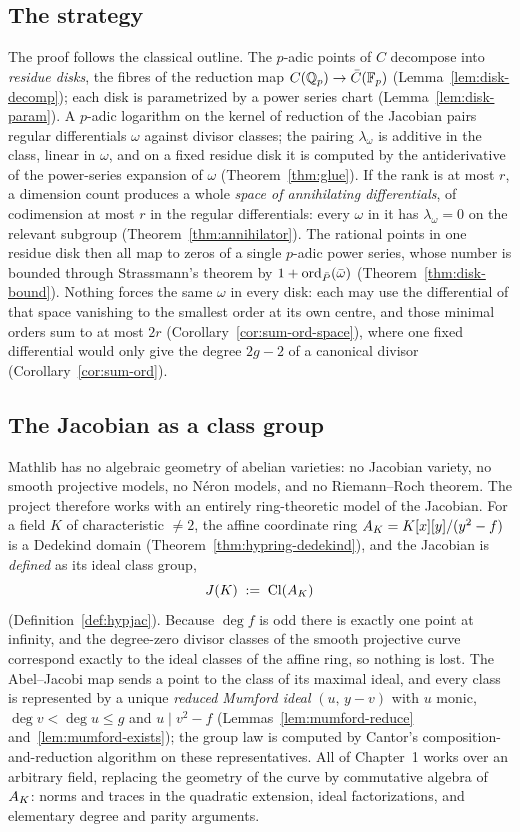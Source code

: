 \subsection*{The strategy}

The proof follows the classical outline. The $p$-adic points of $C$ decompose into
\emph{residue disks}, the fibres of the reduction map $C(\mathbb{Q}_p) \to \bar C(\mathbb{F}_p)$
(Lemma~\ref{lem:disk-decomp}); each disk is parametrized by a power series chart
(Lemma~\ref{lem:disk-param}). A $p$-adic logarithm on the kernel of reduction of the
Jacobian pairs regular differentials $\omega$ against divisor classes; the pairing
$\lambda_\omega$ is additive in the class, linear in $\omega$, and on a fixed residue disk
it is computed by the antiderivative of the power-series expansion of $\omega$
(Theorem~\ref{thm:glue}). If the rank is at most $r$, a dimension count produces a whole
\emph{space of annihilating differentials}, of codimension at most $r$ in the regular
differentials: every $\omega$ in it has $\lambda_\omega = 0$ on the relevant subgroup
(Theorem~\ref{thm:annihilator}). The rational points in one residue disk then all map to
zeros of a single $p$-adic power series, whose number is bounded through Strassmann's
theorem by $1 + \operatorname{ord}_{\bar P}(\bar\omega)$ (Theorem~\ref{thm:disk-bound}). Nothing forces
the same $\omega$ in every disk: each may use the differential of that space vanishing to
the smallest order at its own centre, and those minimal orders sum to at most $2r$
(Corollary~\ref{cor:sum-ord-space}), where one fixed differential would only give the
degree $2g-2$ of a canonical divisor (Corollary~\ref{cor:sum-ord}).

\subsection*{The Jacobian as a class group}

Mathlib has no algebraic geometry of abelian varieties: no Jacobian variety, no smooth
projective models, no N\'eron models, and no Riemann--Roch theorem. The project therefore
works with an entirely ring-theoretic model of the Jacobian. For a field $K$ of
characteristic $\neq 2$, the affine coordinate ring $A_{K} = K[x][y]/(y^2 - f)$ is a
Dedekind domain (Theorem~\ref{thm:hypring-dedekind}), and the Jacobian is \emph{defined} as
its ideal class group,
\[
  J(K) \;:=\; \operatorname{Cl}(A_{K})
\]
(Definition~\ref{def:hypjac}). Because $\deg f$ is odd there is exactly one point at
infinity, and the degree-zero divisor classes of the smooth projective curve correspond
exactly to the ideal classes of the affine ring, so nothing is lost. The Abel--Jacobi map
sends a point to the class of its maximal ideal, and every class is represented by a unique
\emph{reduced Mumford ideal} $(u,\, y - v)$ with $u$ monic, $\deg v < \deg u \le g$ and
$u \mid v^2 - f$ (Lemmas~\ref{lem:mumford-reduce} and~\ref{lem:mumford-exists}); the group
law is computed by Cantor's composition-and-reduction algorithm on these representatives.
All of Chapter~1 works over an arbitrary field, replacing the geometry of the curve by
commutative algebra of $A_{K}$: norms and traces in the quadratic extension, ideal
factorizations, and elementary degree and parity arguments.


